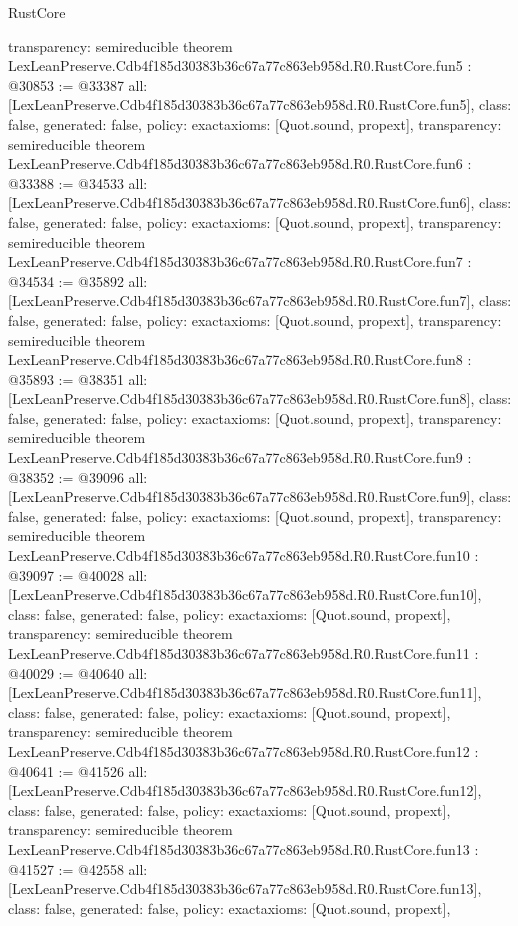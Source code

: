 \begin{lexlean}{RustCore}
\begin{coremodule}
{  transparency: semireducible
}
theorem LexLeanPreserve.Cdb4f185d30383b36c67a77c863eb958d.R0.RustCore.fun5 : @30853 := @33387 {
  all: [LexLeanPreserve.Cdb4f185d30383b36c67a77c863eb958d.R0.RustCore.fun5],
  class: false,
  generated: false,
  policy: exact{axioms: [Quot.sound, propext]},
  transparency: semireducible
}
theorem LexLeanPreserve.Cdb4f185d30383b36c67a77c863eb958d.R0.RustCore.fun6 : @33388 := @34533 {
  all: [LexLeanPreserve.Cdb4f185d30383b36c67a77c863eb958d.R0.RustCore.fun6],
  class: false,
  generated: false,
  policy: exact{axioms: [Quot.sound, propext]},
  transparency: semireducible
}
theorem LexLeanPreserve.Cdb4f185d30383b36c67a77c863eb958d.R0.RustCore.fun7 : @34534 := @35892 {
  all: [LexLeanPreserve.Cdb4f185d30383b36c67a77c863eb958d.R0.RustCore.fun7],
  class: false,
  generated: false,
  policy: exact{axioms: [Quot.sound, propext]},
  transparency: semireducible
}
theorem LexLeanPreserve.Cdb4f185d30383b36c67a77c863eb958d.R0.RustCore.fun8 : @35893 := @38351 {
  all: [LexLeanPreserve.Cdb4f185d30383b36c67a77c863eb958d.R0.RustCore.fun8],
  class: false,
  generated: false,
  policy: exact{axioms: [Quot.sound, propext]},
  transparency: semireducible
}
theorem LexLeanPreserve.Cdb4f185d30383b36c67a77c863eb958d.R0.RustCore.fun9 : @38352 := @39096 {
  all: [LexLeanPreserve.Cdb4f185d30383b36c67a77c863eb958d.R0.RustCore.fun9],
  class: false,
  generated: false,
  policy: exact{axioms: [Quot.sound, propext]},
  transparency: semireducible
}
theorem LexLeanPreserve.Cdb4f185d30383b36c67a77c863eb958d.R0.RustCore.fun10 : @39097 := @40028 {
  all: [LexLeanPreserve.Cdb4f185d30383b36c67a77c863eb958d.R0.RustCore.fun10],
  class: false,
  generated: false,
  policy: exact{axioms: [Quot.sound, propext]},
  transparency: semireducible
}
theorem LexLeanPreserve.Cdb4f185d30383b36c67a77c863eb958d.R0.RustCore.fun11 : @40029 := @40640 {
  all: [LexLeanPreserve.Cdb4f185d30383b36c67a77c863eb958d.R0.RustCore.fun11],
  class: false,
  generated: false,
  policy: exact{axioms: [Quot.sound, propext]},
  transparency: semireducible
}
theorem LexLeanPreserve.Cdb4f185d30383b36c67a77c863eb958d.R0.RustCore.fun12 : @40641 := @41526 {
  all: [LexLeanPreserve.Cdb4f185d30383b36c67a77c863eb958d.R0.RustCore.fun12],
  class: false,
  generated: false,
  policy: exact{axioms: [Quot.sound, propext]},
  transparency: semireducible
}
theorem LexLeanPreserve.Cdb4f185d30383b36c67a77c863eb958d.R0.RustCore.fun13 : @41527 := @42558 {
  all: [LexLeanPreserve.Cdb4f185d30383b36c67a77c863eb958d.R0.RustCore.fun13],
  class: false,
  generated: false,
  policy: exact{axioms: [Quot.sound, propext]},
}
\end{coremodule}
\end{lexlean}
